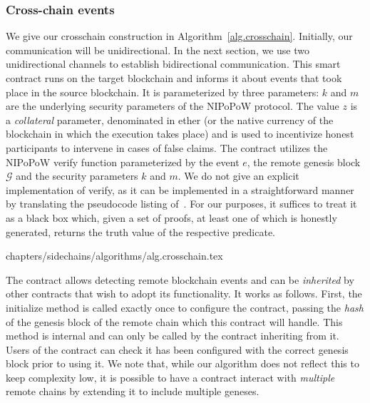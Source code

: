 \subsubsection{Cross-chain events}

We give our \textsf{crosschain} construction in Algorithm~\ref{alg.crosschain}.
Initially, our communication will be unidirectional. In the next section, we
use two unidirectional channels to establish bidirectional communication. This
smart contract runs on the target blockchain and informs it about events that
took place in the source blockchain. It is parameterized by three parameters:
$k$ and $m$ are the underlying security parameters of the NIPoPoW protocol. The
value $z$ is a \emph{collateral} parameter, denominated in ether (or the native
currency of the blockchain in which the execution takes place) and is used to
incentivize honest participants to intervene in cases of false claims. The
contract utilizes the NIPoPoW \textsf{verify} function parameterized by the
event $e$, the remote genesis block $\mathcal{G}$ and the security parameters
$k$ and $m$. We do not give an explicit implementation of \textsf{verify}, as it
can be implemented in a straightforward manner by translating the pseudocode
listing of~\cite{nipopows}. For our purposes, it suffices to treat it as a black
box which, given a set of proofs, at least one of which is honestly generated,
returns the truth value of the respective predicate.

{chapters/sidechains/algorithms/alg.crosschain.tex}

The contract allows detecting remote blockchain events and can be \emph{inherited}
by other contracts that wish to adopt its functionality. It works as follows.
First, the \textsf{initialize} method is called exactly once to configure the
contract, passing the \emph{hash} of the genesis block of the remote chain which
this contract will handle. This method is \textsf{internal} and can only be
called by the contract inheriting from it. Users of the contract can check  it
has been configured with the correct genesis block prior to using it. We note
that, while our algorithm does not reflect this to keep complexity low, it is
possible to have a contract interact with \emph{multiple} remote chains by
extending it to include multiple geneses.

